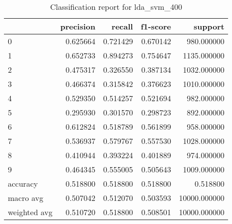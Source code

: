 \begin{table}[htb!]
\centering
\caption{Classification report for lda_svm_400}
\label{tab:classification-report-lda_svm_400}
\begin{tabular}{lrrrr}
\toprule
 & precision & recall & f1-score & support \\
\midrule
0 & 0.625664 & 0.721429 & 0.670142 & 980.000000 \\
1 & 0.652733 & 0.894273 & 0.754647 & 1135.000000 \\
2 & 0.475317 & 0.326550 & 0.387134 & 1032.000000 \\
3 & 0.466374 & 0.315842 & 0.376623 & 1010.000000 \\
4 & 0.529350 & 0.514257 & 0.521694 & 982.000000 \\
5 & 0.295930 & 0.301570 & 0.298723 & 892.000000 \\
6 & 0.612824 & 0.518789 & 0.561899 & 958.000000 \\
7 & 0.536937 & 0.579767 & 0.557530 & 1028.000000 \\
8 & 0.410944 & 0.393224 & 0.401889 & 974.000000 \\
9 & 0.464345 & 0.555005 & 0.505643 & 1009.000000 \\
accuracy & 0.518800 & 0.518800 & 0.518800 & 0.518800 \\
macro avg & 0.507042 & 0.512070 & 0.503593 & 10000.000000 \\
weighted avg & 0.510720 & 0.518800 & 0.508501 & 10000.000000 \\
\bottomrule
\end{tabular}
\end{table}
